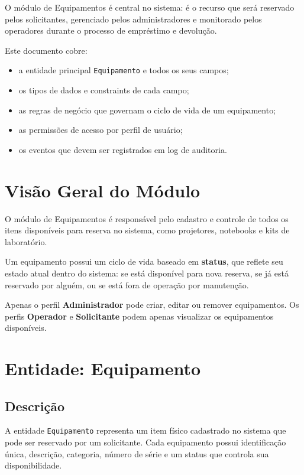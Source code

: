 \documentclass[12pt, a4paper]{article}
\begin{document}
O módulo de Equipamentos é central no sistema: é o recurso que será reservado pelos
solicitantes, gerenciado pelos administradores e monitorado pelos operadores durante o
processo de empréstimo e devolução.

Este documento cobre:
\begin{itemize}
  \item a entidade principal \texttt{Equipamento} e todos os seus campos;
  \item os tipos de dados e constraints de cada campo;
  \item as regras de negócio que governam o ciclo de vida de um equipamento;
  \item as permissões de acesso por perfil de usuário;
  \item os eventos que devem ser registrados em log de auditoria.
\end{itemize}

\section{Visão Geral do Módulo}

O módulo de Equipamentos é responsável pelo cadastro e controle de todos os itens
disponíveis para reserva no sistema, como projetores, notebooks e kits de laboratório.

Um equipamento possui um ciclo de vida baseado em \textbf{status}, que reflete seu estado
atual dentro do sistema: se está disponível para nova reserva, se já está reservado por
alguém, ou se está fora de operação por manutenção.

Apenas o perfil \textbf{Administrador} pode criar, editar ou remover equipamentos.
Os perfis \textbf{Operador} e \textbf{Solicitante} podem apenas visualizar os equipamentos
disponíveis.

\section{Entidade: Equipamento}

\subsection{Descrição}

A entidade \texttt{Equipamento} representa um item físico cadastrado no sistema que pode
ser reservado por um solicitante. Cada equipamento possui identificação única, descrição,
categoria, número de série e um status que controla sua disponibilidade.
\end{document}

